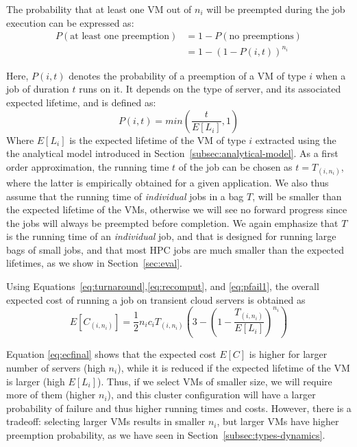 The probability that at least one VM out of $n_i$ will be preempted during the job execution can be expressed as:
\begin{align}
  \label{eq:pfail1}
  P(\text{at least one preemption}) &= 1-P(\text{no preemptions}) \\
                                 &= 1-\left(1-P\left(i, t\right)\right)^{n_i}
\end{align}

Here, $P(i, t)$ denotes the probability of a preemption of a VM of type $i$ when a job of duration $t$ runs on it. 
%
It depends on the type of server, and its associated expected lifetime, and is defined as:
\begin{equation}
  \label{eq:pi}
  P(i, t) = min\left(\dfrac{t}{E[L_i]}, 1\right)
\end{equation}
Where $E[L_i]$ is the expected lifetime of the VM of type $i$ extracted using the the analytical model introduced in Section~\ref{subsec:analytical-model}.
As a first order approximation, the running time $t$ of the job can be chosen as $t=T_{( i,n_i )}$, where the latter is empirically obtained for a given application.
We also thus assume that the running time of \emph{individual} jobs in a bag $T$, will be smaller than the expected lifetime of the VMs, otherwise we will see no forward progress since the jobs will always be preempted before completion.
We again emphasize that $T$ is the running time of an \emph{individual} job, and that \sysname is designed for running large bags of small jobs, and that most HPC jobs are much smaller than the expected lifetimes, as we show in Section~\ref{sec:eval}. 



Using Equations~\ref{eq:turnaround},\ref{eq:recomput}, and \ref{eq:pfail1}, the overall expected cost of running a job on transient cloud servers is obtained as
\begin{equation}
  \label{eq:ecfinal}
  E[C_{( i,n_i )}] = \frac{1}{2}n_i c_i T_{( i,n_i )}\left(3 - \left(1-\dfrac{T_{( i,n_i )}}{E[L_i]}\right)^{n_i}\right)
\end{equation}

Equation \ref{eq:ecfinal} shows that the expected cost $E[C]$ is higher for larger number of servers (high $n_i$), while it is reduced if the expected lifetime of the VM is larger (high $E[L_i]$).
%
Thus, if we select VMs of smaller size, we will require more of them (higher $n_i$), and this cluster configuration will have a larger probability of failure and thus higher running times and costs.
However, there is a tradeoff: selecting larger VMs results in smaller $n_i$, but larger VMs have higher preemption probability, as we have seen in Section~\ref{subsec:types-dynamics}. 




